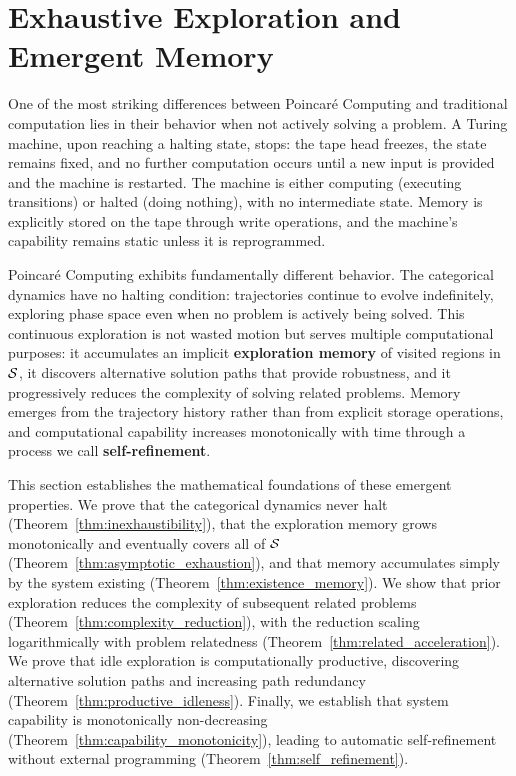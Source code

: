 \section{Exhaustive Exploration and Emergent Memory}
\label{sec:exhaustive}

One of the most striking differences between Poincaré Computing and traditional computation lies in their behavior when not actively solving a problem. A Turing machine, upon reaching a halting state, stops: the tape head freezes, the state remains fixed, and no further computation occurs until a new input is provided and the machine is restarted. The machine is either computing (executing transitions) or halted (doing nothing), with no intermediate state. Memory is explicitly stored on the tape through write operations, and the machine's capability remains static unless it is reprogrammed.

Poincaré Computing exhibits fundamentally different behavior. The categorical dynamics have no halting condition: trajectories continue to evolve indefinitely, exploring phase space even when no problem is actively being solved. This continuous exploration is not wasted motion but serves multiple computational purposes: it accumulates an implicit \textbf{exploration memory} of visited regions in $\mathcal{S}$, it discovers alternative solution paths that provide robustness, and it progressively reduces the complexity of solving related problems. Memory emerges from the trajectory history rather than from explicit storage operations, and computational capability increases monotonically with time through a process we call \textbf{self-refinement}.

This section establishes the mathematical foundations of these emergent properties. We prove that the categorical dynamics never halt (Theorem~\ref{thm:inexhaustibility}), that the exploration memory grows monotonically and eventually covers all of $\mathcal{S}$ (Theorem~\ref{thm:asymptotic_exhaustion}), and that memory accumulates simply by the system existing (Theorem~\ref{thm:existence_memory}). We show that prior exploration reduces the complexity of subsequent related problems (Theorem~\ref{thm:complexity_reduction}), with the reduction scaling logarithmically with problem relatedness (Theorem~\ref{thm:related_acceleration}). We prove that idle exploration is computationally productive, discovering alternative solution paths and increasing path redundancy (Theorem~\ref{thm:productive_idleness}). Finally, we establish that system capability is monotonically non-decreasing (Theorem~\ref{thm:capability_monotonicity}), leading to automatic self-refinement without external programming (Theorem~\ref{thm:self_refinement}).

